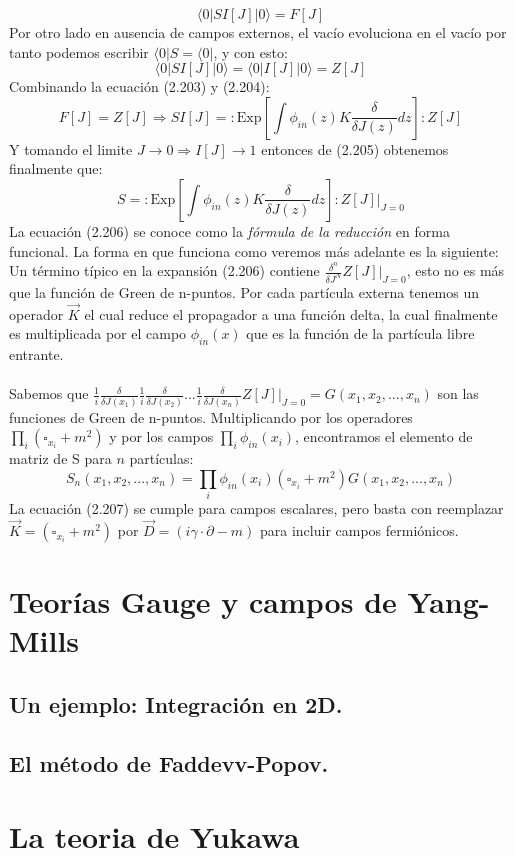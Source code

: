 \begin{equation}
\langle 0|SI[J]|0\rangle=F[J]
\end{equation}
Por otro lado en ausencia de campos externos, el vacío evoluciona en el vacío por tanto podemos escribir $\langle 0|S=\langle 0|$, y con esto:
\begin{equation}
\langle 0|SI[J]|0\rangle=\langle 0|I[J]|0\rangle=Z[J]
\end{equation}
Combinando la ecuación (2.203) y (2.204):
\begin{equation}
F[J]=Z[J]\Rightarrow SI[J]=:\text{Exp}\left[\int\phi_{in}(z)K\frac{\delta}{\delta J(z)}dz\right]:Z[J]
\end{equation}
Y tomando el limite $J\to 0\Rightarrow I[J]\to 1$ entonces de (2.205) obtenemos finalmente que:
\begin{equation}
S=:\text{Exp}\left[\int\phi_{in}(z)K\frac{\delta}{\delta J(z)}dz\right]:Z[J]|_{J=0}
\end{equation} 
La ecuación (2.206) se conoce como la \textit{fórmula de la reducción} en forma funcional. La forma en que funciona como veremos más adelante es la siguiente: Un término típico en la expansión (2.206) contiene $\frac{\delta^n}{\delta J^N}Z[J]|_{J=0}$, esto no es más que la función de Green de n-puntos. Por cada partícula externa tenemos un operador $\vec{K}$ el cual reduce el propagador a una función delta, la cual finalmente es multiplicada por el campo $\phi_{in}(x)$ que es la función de la partícula libre entrante.
\\
\\
Sabemos que $\frac{1}{i}\frac{\delta}{\delta J(x_{1})}\frac{1}{i}\frac{\delta}{\delta J(x_{2})}...\frac{1}{i}\frac{\delta}{\delta J(x_{n})}Z[J]|_{J=0}=G(x_{1},x_{2},...,x_{n})$ son las funciones de Green de n-puntos. Multiplicando por los operadores $\prod_{i}(\square_{x_i}+m^2)$ y por los campos $\prod_{i}\phi_{in}(x_i)$, encontramos el elemento de matriz de S para $n$ partículas:
\begin{equation}
S_{n}(x_{1},x_{2},...,x_{n})=\prod_{i}\phi_{in}(x_{i})(\square_{x_{i}}+m^{2})G(x_{1},x_{2},...,x_{n})
\end{equation}
La ecuación (2.207) se cumple para campos escalares, pero basta con reemplazar $\vec{K}=(\square_{x_{i}}+m^{2})$ por $\vec{D}=(i\gamma\cdot\partial-m)$ para incluir campos fermiónicos.







\section{Teorías Gauge y campos de Yang-Mills}
\subsection{Un ejemplo: Integración en 2D.}
\subsection{El método de Faddevv-Popov.}




\section{La teoria de Yukawa}